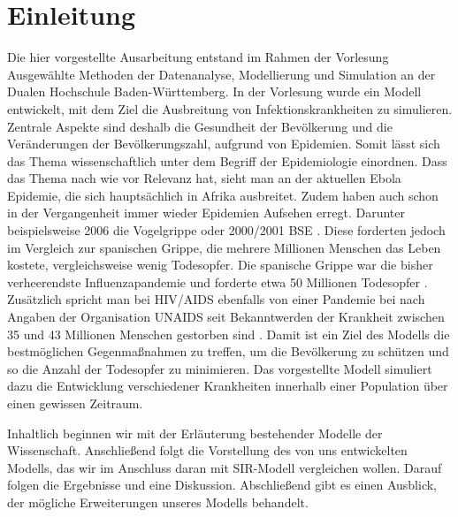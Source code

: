 \section*{Einleitung}

Die hier vorgestellte Ausarbeitung entstand im Rahmen der Vorlesung \glqq Ausgewählte Methoden der Datenanalyse, Modellierung und Simulation\grqq\; an der Dualen Hochschule Baden-Württemberg.
In der Vorlesung wurde ein Modell entwickelt, mit dem Ziel die Ausbreitung von Infektionskrankheiten zu simulieren.
Zentrale Aspekte sind deshalb die Gesundheit der Bevölkerung und die Veränderungen der Bevölkerungszahl, aufgrund von Epidemien. Somit lässt sich das Thema wissenschaftlich unter dem Begriff der Epidemiologie einordnen.
Dass das Thema nach wie vor Relevanz hat, sieht man an der aktuellen Ebola Epidemie, die sich hauptsächlich in Afrika ausbreitet. Zudem haben auch schon in der Vergangenheit immer wieder Epidemien Aufsehen erregt. Darunter beispielsweise 2006 die Vogelgrippe  \cite{gehlhoff2007chronik}
oder 2000/2001 BSE \cite{Spon:2014}. Diese forderten jedoch im Vergleich zur spanischen Grippe, die mehrere Millionen Menschen das Leben kostete, vergleichsweise wenig Todesopfer. Die spanische Grippe war die bisher verheerendste Influenzapandemie und forderte etwa 50 Millionen Todesopfer \cite{welt:2014}. Zusätzlich spricht man bei HIV/AIDS ebenfalls von einer Pandemie bei nach Angaben der Organisation UNAIDS seit Bekanntwerden der Krankheit zwischen 35 und 43 Millionen Menschen gestorben sind  \cite{UNAIDS:2014}.
Damit ist ein Ziel des Modells die bestmöglichen Gegenmaßnahmen zu treffen, um die Bevölkerung zu schützen und so die Anzahl der Todesopfer zu minimieren.
Das vorgestellte Modell simuliert dazu die Entwicklung verschiedener Krankheiten innerhalb einer Population über einen gewissen Zeitraum. 
\smallskip

Inhaltlich beginnen wir mit der Erläuterung bestehender Modelle der Wissenschaft. Anschließend folgt die Vorstellung des von uns entwickelten Modells, das wir im Anschluss daran mit SIR-Modell vergleichen wollen. Darauf folgen die Ergebnisse und eine Diskussion. Abschließend gibt es einen Ausblick, der mögliche Erweiterungen unseres Modells behandelt. 

